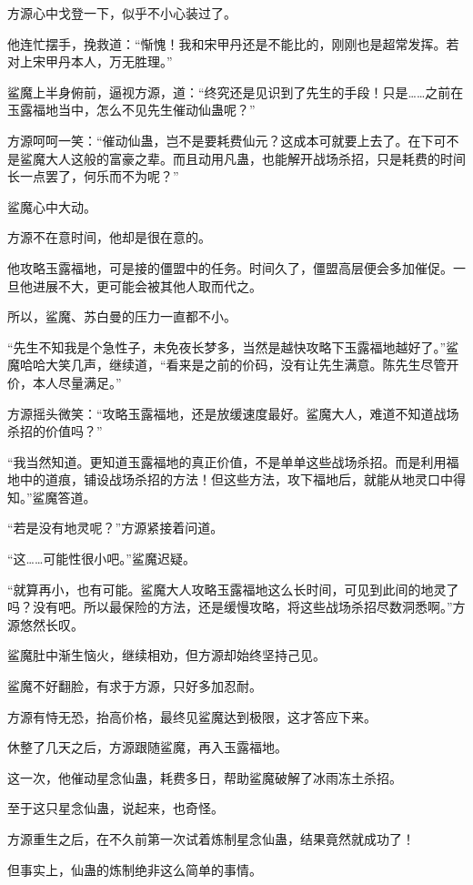 \begin{this_body}
方源心中戈登一下，似乎不小心装过了。

他连忙摆手，挽救道：“惭愧！我和宋甲丹还是不能比的，刚刚也是超常发挥。若对上宋甲丹本人，万无胜理。”

鲨魔上半身俯前，逼视方源，道：“终究还是见识到了先生的手段！只是……之前在玉露福地当中，怎么不见先生催动仙蛊呢？”

方源呵呵一笑：“催动仙蛊，岂不是要耗费仙元？这成本可就要上去了。在下可不是鲨魔大人这般的富豪之辈。而且动用凡蛊，也能解开战场杀招，只是耗费的时间长一点罢了，何乐而不为呢？”

鲨魔心中大动。

方源不在意时间，他却是很在意的。

他攻略玉露福地，可是接的僵盟中的任务。时间久了，僵盟高层便会多加催促。一旦他进展不大，更可能会被其他人取而代之。

所以，鲨魔、苏白曼的压力一直都不小。

“先生不知我是个急性子，未免夜长梦多，当然是越快攻略下玉露福地越好了。”鲨魔哈哈大笑几声，继续道，“看来是之前的价码，没有让先生满意。陈先生尽管开价，本人尽量满足。”

方源摇头微笑：“攻略玉露福地，还是放缓速度最好。鲨魔大人，难道不知道战场杀招的价值吗？”

“我当然知道。更知道玉露福地的真正价值，不是单单这些战场杀招。而是利用福地中的道痕，铺设战场杀招的方法！但这些方法，攻下福地后，就能从地灵口中得知。”鲨魔答道。

“若是没有地灵呢？”方源紧接着问道。

“这……可能性很小吧。”鲨魔迟疑。

“就算再小，也有可能。鲨魔大人攻略玉露福地这么长时间，可见到此间的地灵了吗？没有吧。所以最保险的方法，还是缓慢攻略，将这些战场杀招尽数洞悉啊。”方源悠然长叹。

鲨魔肚中渐生恼火，继续相劝，但方源却始终坚持己见。

鲨魔不好翻脸，有求于方源，只好多加忍耐。

方源有恃无恐，抬高价格，最终见鲨魔达到极限，这才答应下来。

休整了几天之后，方源跟随鲨魔，再入玉露福地。

这一次，他催动星念仙蛊，耗费多日，帮助鲨魔破解了冰雨冻土杀招。

至于这只星念仙蛊，说起来，也奇怪。

方源重生之后，在不久前第一次试着炼制星念仙蛊，结果竟然就成功了！

但事实上，仙蛊的炼制绝非这么简单的事情。


\end{this_body}
